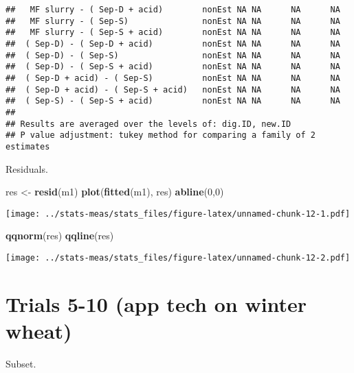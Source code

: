 \documentclass[
]{article}
\newenvironment{Shaded}{\begin{snugshade}}{\end{snugshade}}
\newcommand{\DecValTok}[1]{\textcolor[rgb]{0.00,0.00,0.81}{#1}}
\newcommand{\FunctionTok}[1]{\textcolor[rgb]{0.13,0.29,0.53}{\textbf{#1}}}
\newcommand{\NormalTok}[1]{#1}
\newcommand{\OtherTok}[1]{\textcolor[rgb]{0.56,0.35,0.01}{#1}}
\begin{document}
\begin{verbatim}
##   MF slurry - ( Sep-D + acid)        nonEst NA NA      NA      NA
##   MF slurry - ( Sep-S)               nonEst NA NA      NA      NA
##   MF slurry - ( Sep-S + acid)        nonEst NA NA      NA      NA
##  ( Sep-D) - ( Sep-D + acid)          nonEst NA NA      NA      NA
##  ( Sep-D) - ( Sep-S)                 nonEst NA NA      NA      NA
##  ( Sep-D) - ( Sep-S + acid)          nonEst NA NA      NA      NA
##  ( Sep-D + acid) - ( Sep-S)          nonEst NA NA      NA      NA
##  ( Sep-D + acid) - ( Sep-S + acid)   nonEst NA NA      NA      NA
##  ( Sep-S) - ( Sep-S + acid)          nonEst NA NA      NA      NA
## 
## Results are averaged over the levels of: dig.ID, new.ID 
## P value adjustment: tukey method for comparing a family of 2 estimates
\end{verbatim}

Residuals.

\begin{Shaded}
\begin{Highlighting}[]
\NormalTok{res }\OtherTok{\textless{}{-}} \FunctionTok{resid}\NormalTok{(m1)}
\FunctionTok{plot}\NormalTok{(}\FunctionTok{fitted}\NormalTok{(m1), res)}
\FunctionTok{abline}\NormalTok{(}\DecValTok{0}\NormalTok{,}\DecValTok{0}\NormalTok{)}
\end{Highlighting}
\end{Shaded}

\texttt{[image: ../stats-meas/stats\_files/figure-latex/unnamed-chunk-12-1.pdf]}

\begin{Shaded}
\begin{Highlighting}[]
\FunctionTok{qqnorm}\NormalTok{(res)}
\FunctionTok{qqline}\NormalTok{(res)}
\end{Highlighting}
\end{Shaded}

\texttt{[image: ../stats-meas/stats\_files/figure-latex/unnamed-chunk-12-2.pdf]}

\section{Trials 5-10 (app tech on winter
wheat)}\label{trials-5-10-app-tech-on-winter-wheat}

Subset.
\end{document}
